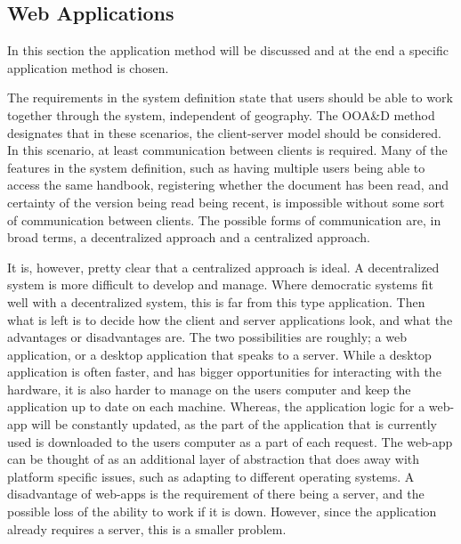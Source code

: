 \subsection{Web Applications}
In this section the application method will be discussed and at the end a specific application method is chosen.

The requirements in the system definition state that users should be able to work together through the system, independent of geography.
The OOA\&D method designates that in these scenarios, the client-server model should be considered.
In this scenario, at least communication between clients is required.
Many of the features in the system definition, such as having multiple users being able to access the same handbook, registering whether the document has been read, and certainty of the version being read being recent, is impossible without some sort of communication between clients.
The possible forms of communication are, in broad terms, a decentralized approach and a centralized approach.

It is, however, pretty clear that a centralized approach is ideal.
A decentralized system is more difficult to develop and manage.
Where democratic systems fit well with a decentralized system, this is far from this type application.
Then what is left is to decide how the client and server applications look, and what the advantages or disadvantages are.
The two possibilities are roughly; a web application, or a desktop application that speaks to a server.
While a desktop application is often faster, and has bigger opportunities for interacting with the hardware, it is also harder to manage on the users computer and keep the application up to date on each machine.
Whereas, the application logic for a web-app will be constantly updated, as the part of the application that is currently used is downloaded to the users computer as a part of each request.
The web-app can be thought of as an additional layer of abstraction that does away with platform specific issues, such as adapting to different operating systems.
A disadvantage of web-apps is the requirement of there being a server, and the possible loss of the ability to work if it is down.
However, since the application already requires a server, this is a smaller problem.

